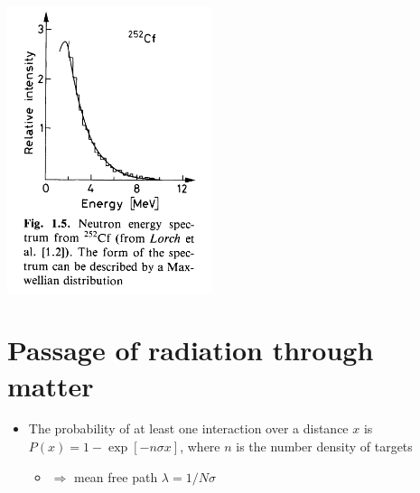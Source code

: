\documentclass[11pt]{article}
\begin{document}
\begin{itemize}
\begin{center}
  \includegraphics[width=0.45\textwidth,valign=t]{figs/q_neutron.png}
\end{center}
\end{itemize}

\section{Passage of radiation through matter}
\begin{itemize}
  \item The probability of at least one interaction over a distance $x$ is $P(x) = 1-\exp[-n\sigma x]$, where $n$ is the number density of targets
  \begin{itemize}
    \item $\Rightarrow$ mean free path $\lambda = 1/N\sigma$
  \end{itemize}
\end{itemize}
\end{document}
